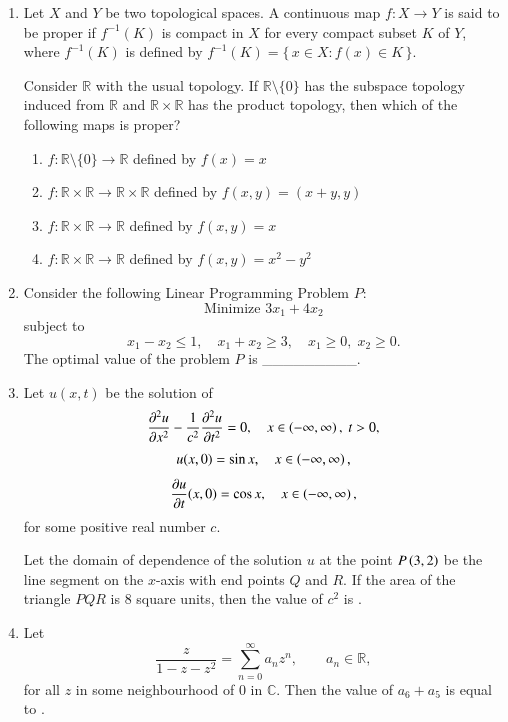 \documentclass[journal,12pt,onecolumn]{IEEEtran}
\theoremstyle{remark}
\begin{document}
\begin{enumerate}[start=1, label=Q.\arabic*]
\item Let $X$ and $Y$ be two topological spaces. A continuous map $f : X\to Y$ is said to be proper if $f^{-1}(K)$ is compact in $X$ for every compact subset $K$ of $Y$, where $f^{-1}(K)$ is defined by $f^{-1}(K)=\{\, x\in X : f(x)\in K \,\}$.  

Consider $\mathbb{R}$ with the usual topology. If $\mathbb{R}\setminus \{0\}$ has the subspace topology induced from $\mathbb{R}$ and $\mathbb{R}\times \mathbb{R}$ has the product topology, then which of the following maps is proper?
\begin{enumerate}
\item $f : \mathbb{R}\setminus \{0\}\to \mathbb{R}$ defined by $f(x)=x$
\item $f : \mathbb{R}\times \mathbb{R}\to \mathbb{R}\times \mathbb{R}$ defined by $f(x,y)=(x+y,y)$
\item $f : \mathbb{R}\times \mathbb{R}\to \mathbb{R}$ defined by $f(x,y)=x$
\item $f : \mathbb{R}\times \mathbb{R}\to \mathbb{R}$ defined by $f(x,y)=x^{2}-y^{2}$
\end{enumerate}

\hfill{}

\item Consider the following Linear Programming Problem $P$:  
\[
\text{Minimize } 3x_{1}+4x_{2}
\]
subject to
\[
x_{1}-x_{2}\leq 1,\quad x_{1}+x_{2}\geq 3,\quad x_{1}\geq 0,\;x_{2}\geq 0.
\]
The optimal value of the problem $P$ is \_\_\_\_\_\_\_\_\_.

\hfill{}

\item Let $u(x,t)$ be the solution of
\[
\dfrac{\partial^{2}u}{\partial x^{2}}-\dfrac{1}{c^{2}}\dfrac{\partial^{2}u}{\partial t^{2}}=0,\quad x \in \left(-\infty,\infty\right),\ t>0,
\]
\[
u(x,0)=\sin x,\quad x \in \left(-\infty,\infty\right),
\]
\[
\dfrac{\partial u}{\partial t}(x,0)=\cos x,\quad x \in \left(-\infty,\infty\right),
\]
for some positive real number $c$.  

Let the domain of dependence of the solution $u$ at the point $P\left(3,2\right)$ be the line segment on the $x$\mbox{-}axis with end points $Q$ and $R$. If the area of the triangle $PQR$ is $8$ square units, then the value of $c^{2}$ is \underline{\hspace{2cm}}.

\hfill{}


\item Let
\[
\dfrac{z}{1-z-z^{2}}=\sum_{n=0}^{\infty} a_{n} z^{n},\qquad a_{n}\in \mathbb{R},
\]
for all $z$ in some neighbourhood of $0$ in $\mathbb{C}$. Then the value of $a_{6}+a_{5}$ is equal to \underline{\hspace{2cm}}.


\end{enumerate}
\end{document}
